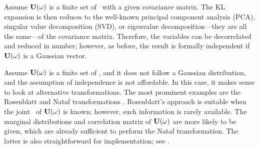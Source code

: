 Assume $\mathbf{U}(\omega)$ is a finite set of \rvs\ with a given covariance matrix. The KL expansion is then reduces to the well-known principal component analysis (PCA), singular value decomposition (SVD), or eigenvalue decomposition---they are all the same---of the covariance matrix. Therefore, the variables can be decorrelated and reduced in number; however, as before, the result is formally independent if $\mathbf{U}(\omega)$ is a Gaussian vector.

Assume $\mathbf{U}(\omega)$ is a finite set of \rvs, and it does not follow a Gaussian distribution, and the assumption of independence is not affordable. In this case, it makes sense to look at alternative transformations. The most prominent examples are the Rosenblatt and Nataf transformations \cite{eldred2009, li2008}. Rosenblatt's approach is suitable when the joint \pdf\ of $\mathbf{U}(\omega)$ is known; however, such information is rarely available. The marginal distributions and correlation matrix of $\mathbf{U}(\omega)$ are more likely to be given, which are already sufficient to perform the Nataf transformation. The latter is also straightforward for implementation; see \cite{li2008}.
